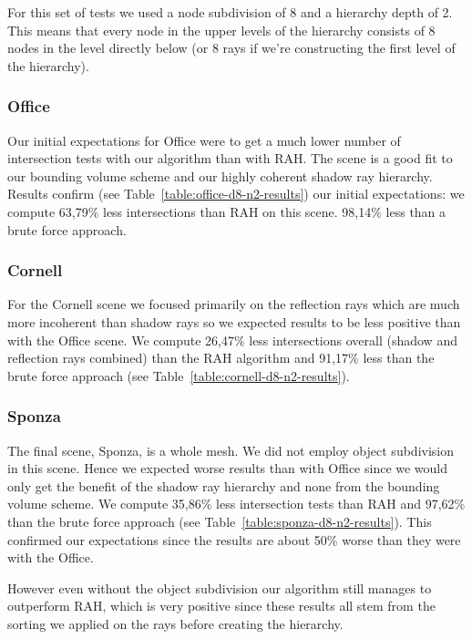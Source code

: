 For this set of tests we used a node subdivision of 8 and a hierarchy depth of 2. This means that every node in the upper levels of the hierarchy consists of 8 nodes in the level directly below (or 8 rays if we're constructing the first level of the hierarchy).

\subsubsection{Office}

Our initial expectations for Office were to get a much lower number of intersection tests with our algorithm than with RAH. The scene is a good fit to our bounding volume scheme and our highly coherent shadow ray hierarchy. Results confirm (see Table~\ref{table:office-d8-n2-results}) our initial expectations: we compute 63,79\% less intersections than RAH on this scene. 98,14\% less than a brute force approach.

\subsubsection{Cornell}

For the Cornell scene we focused primarily on the reflection rays which are much more incoherent than shadow rays so we expected results to be less positive than with the Office scene. We compute 26,47\% less intersections overall (shadow and reflection rays combined) than the RAH algorithm and 91,17\% less than the brute force approach (see Table~\ref{table:cornell-d8-n2-results}).

\subsubsection{Sponza}

The final scene, Sponza, is a whole mesh. We did not employ object subdivision in this scene. Hence we expected worse results than with Office since we would only get the benefit of the shadow ray hierarchy and none from the bounding volume scheme. We compute 35,86\% less intersection tests than RAH and 97,62\% than the brute force approach (see Table~\ref{table:sponza-d8-n2-results}). This confirmed our expectations since the results are about 50\% worse than they were with the Office. 

However even without the object subdivision our algorithm still manages to outperform RAH, which is very positive since these results all stem from the sorting we applied on the rays before creating the hierarchy.

